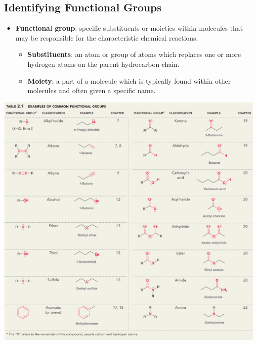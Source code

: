 \documentclass[12pt,a4paper]{article}
\begin{document}
\subsection{Identifying Functional Groups}
\begin{itemize}
    \item \textbf{Functional group}: specific substituents or moieties within molecules that may be responsible for the characteristic chemical reactions.
        \begin{itemize}
            \item \textbf{Substituents}: an atom or group of atoms which replaces one or more hydrogen atoms on the parent hydrocarbon chain.
            \item \textbf{Moiety}: a part of a molecule which is typically found within other molecules and often given a specific name.
        \end{itemize}
\end{itemize}
 \begin{center}
     \includegraphics[scale=0.34]{images/fig2-1.png}
 \end{center}
\end{document}
